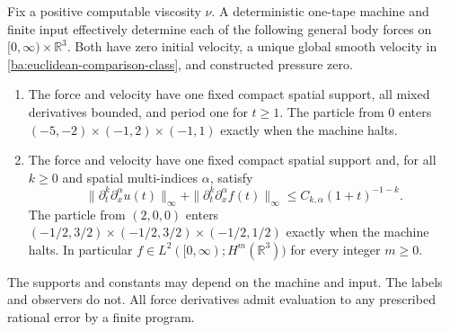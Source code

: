 \begin{theorem}\label{ba:bounded-box-tests}
Fix a positive computable viscosity $\nu$.  A deterministic one-tape
machine and finite input effectively determine each of the following
general body forces on $[0,\infty)\times\mathbb R^3$.  Both have zero
initial velocity, a unique global smooth velocity in
\eqref{ba:euclidean-comparison-class}, and constructed pressure zero.
\begin{enumerate}
\item The force and velocity have one fixed compact spatial support, all
mixed derivatives bounded, and period one for $t\ge1$.  The particle
from $0$ enters $(-5,-2)\times(-1,2)\times(-1,1)$ exactly when the
machine halts.
\item The force and velocity have one fixed compact spatial support and,
for all $k\ge0$ and spatial multi-indices $\alpha$, satisfy
\begin{equation}\label{ba:eighteen-decay}
 \|\partial_t^k\partial_x^\alpha u(t)\|_\infty+
 \|\partial_t^k\partial_x^\alpha f(t)\|_\infty
 \le C_{k,\alpha}(1+t)^{-1-k}.
\end{equation}
The particle from $(2,0,0)$ enters
$(-1/2,3/2)\times(-1/2,3/2)\times(-1/2,1/2)$ exactly when the
machine halts.  In particular $f\in L^2([0,\infty);H^m(\mathbb R^3))$
for every integer $m\ge0$.
\end{enumerate}
The supports and constants may depend on the machine and input.  The
labels and observers do not.  All force derivatives admit evaluation to
any prescribed rational error by a finite program.
\end{theorem}


